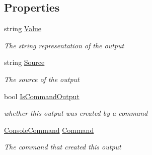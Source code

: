 \subsection*{Properties}
\begin{DoxyCompactItemize}
\item 
string \hyperlink{class_c_p_u___o_s___simulator_1_1_console_1_1_console_output_a1a5c833114630e4739546948e8622cbd}{Value}
\begin{DoxyCompactList}\small\item\em The string representation of the output \end{DoxyCompactList}\item 
string \hyperlink{class_c_p_u___o_s___simulator_1_1_console_1_1_console_output_a9772128aaf7ca7854af11b63ae6e1579}{Source}
\begin{DoxyCompactList}\small\item\em The source of the output \end{DoxyCompactList}\item 
bool \hyperlink{class_c_p_u___o_s___simulator_1_1_console_1_1_console_output_af544be1b6e93789edf3df9e0f573f9ba}{Is\+Command\+Output}
\begin{DoxyCompactList}\small\item\em whether this output was created by a command \end{DoxyCompactList}\item 
\hyperlink{class_c_p_u___o_s___simulator_1_1_console_1_1_console_command}{Console\+Command} \hyperlink{class_c_p_u___o_s___simulator_1_1_console_1_1_console_output_a15b8bc11762105b9b984135cf892a0b5}{Command}
\begin{DoxyCompactList}\small\item\em The command that created this output \end{DoxyCompactList}\end{DoxyCompactItemize}
